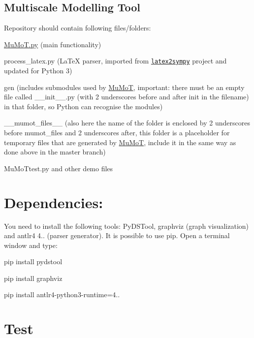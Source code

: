 \subsection*{Multiscale Modelling Tool }

Repository should contain following files/folders\+:
\begin{DoxyItemize}
\item {\ttfamily \hyperlink{_mu_mo_t_8py}{Mu\+Mo\+T.\+py}} (main functionality)
\item {\ttfamily process\+\_\+latex.\+py} (La\+TeX parser, imported from \href{https://github.com/augustt198/latex2sympy}{\tt latex2sympy} project and updated for Python 3)
\item {\ttfamily gen} (includes submodules used by \hyperlink{namespace_mu_mo_t}{Mu\+MoT}, important\+: there must be an empty file called {\ttfamily \+\_\+\+\_\+init\+\_\+\+\_\+.\+py} (with 2 underscores before and after init in the filename) in that folder, so Python can recognise the modules)
\item {\ttfamily \+\_\+\+\_\+mumot\+\_\+files\+\_\+\+\_\+} (also here the name of the folder is enclosed by 2 underscores before mumot\+\_\+files and 2 underscores after, this folder is a placeholder for temporary files that are generated by \hyperlink{namespace_mu_mo_t}{Mu\+MoT}, include it in the same way as done above in the master branch)
\item {\ttfamily Mu\+Mo\+Ttest.\+py} and other demo files
\end{DoxyItemize}

\section*{Dependencies\+:}

You need to install the following tools\+: Py\+D\+S\+Tool, graphviz (graph visualization) and antlr4 4.. (parser generator). It is possible to use pip. Open a terminal window and type\+:


\begin{DoxyItemize}
\item {\ttfamily pip install pydstool}
\item {\ttfamily pip install graphviz}
\item {\ttfamily pip install antlr4-\/python3-\/runtime=4..}
\end{DoxyItemize}

\section*{Test}

